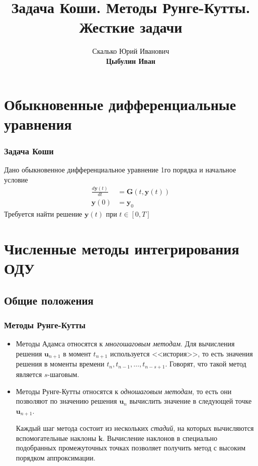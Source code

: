 \documentclass[professionalfonts,compress,unicode,aspectratio=169]{beamer}
\title[Методы Рунге-Кутты]{Задача Коши. Методы Рунге-Кутты. Жесткие задачи}
\author[Цыбулин И.В.]{Скалько Юрий Иванович\\
\textbf{Цыбулин Иван}}
\date{}
\begin{document}
\begin{frame}[plain]
\titlepage
\end{frame}

\renewcommand{\L}{\mathcal{L}}
\renewcommand{\vec}[1]{\boldsymbol{\mathbf{#1}}}
\newcommand{\pd}[2]{\frac{\partial #1}{\partial #2}}
\newcommand{\tr}{\mathsf{T}}

\section{Обыкновенные дифференциальные уравнения}
\begin{frame}\frametitle{Задача Коши}
	Дано обыкновенное дифференциальное уравнение 1го порядка и начальное условие
	\begin{align*}
	\frac{d\vec y(t)}{dt} &= \vec G(t, \vec y(t))\\
	\vec y(0) &= \vec y_0
	\end{align*}
	Требуется найти решение $\vec y(t)$ при $t \in [0, T]$
\end{frame}

\section{Численные методы интегрирования ОДУ}
\subsection{Общие положения}
\begin{frame}\frametitle{Методы Рунге-Кутты}
	\begin{itemize}
	\item
	Методы Адамса относятся к \emph{многошаговым методам}. Для вычисления решения
	$\vec u_{n+1}$ в момент $t_{n+1}$ используется <<история>>, то есть значения
	решения в моменты времени $t_{n}, t_{n-1}, \dots, t_{n-s+1}$. Говорят, что
	такой метод является $s$-шаговым.
	\item
	Методы Рунге-Кутты относятся к \emph{одношаговым методам}, то есть они позволяют по
	значению решения $\vec u_{n}$ вычислить значение в следующей точке $\vec u_{n+1}$.

	Каждый шаг метода состоит из нескольких \emph{стадий}, на которых вычисляются вспомогательные
	наклоны $\vec k$. Вычисление наклонов в специально подобранных промежуточных точках позволяет
	получить метод с высоким порядком аппроксимации.
	\end{itemize}
\end{frame}
\end{document}
